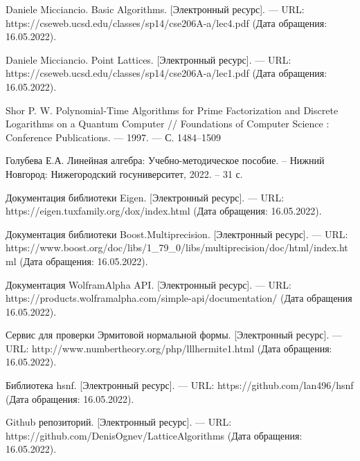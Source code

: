 \newpage


\begin{thebibliography}{10}

Daniele Micciancio. Basic Algorithms. [Электронный ресурс]. --- URL: https://cseweb.ucsd.edu/classes/sp14/cse206A-a/lec4.pdf (Дата обращения: 16.05.2022).

Daniele Micciancio. Point Lattices. [Электронный ресурс]. --- URL: https://cseweb.ucsd.edu/classes/sp14/cse206A-a/lec1.pdf (Дата обращения: 16.05.2022).

Shor P. W. Polynomial-Time Algorithms for Prime Factorization and Discrete Logarithms on a Quantum Computer // Foundations of Computer Science : Conference Publications. — 1997. — С. 1484–1509

Голубева Е.А. Линейная алгебра: Учебно-методическое
пособие. – Нижний Новгород: Нижегородский госуниверситет, 2022. – 31 с.

Документация библиотеки Eigen. [Электронный ресурс]. --- URL: https://eigen.tuxfamily.org/dox/index.html (Дата обращения: 16.05.2022).

Документация библиотеки Boost.Multiprecision. [Электронный ресурс]. --- URL: https://www.boost.org/doc/libs/1\_79\_0/libs/multiprecision/doc/html/index.html (Дата обращения: 16.05.2022).

Документация WolframAlpha API. [Электронный ресурс]. --- URL: https://products.wolframalpha.com/simple-api/documentation/ (Дата обращения 16.05.2022).

Сервис для проверки Эрмитовой нормальной формы. [Электронный ресурс]. --- URL: http://www.numbertheory.org/php/lllhermite1.html (Дата обращения: 16.05.2022).

Библиотека hsnf. [Электронный ресурс]. --- URL: https://github.com/lan496/hsnf (Дата обращения: 16.05.2022).

Github репозиторий. [Электронный ресурс]. --- URL: https://github.com/DenisOgnev/Lat\-tice\-Algorithms (Дата обращения: 16.05.2022).
 

\end{thebibliography}

\clearpage